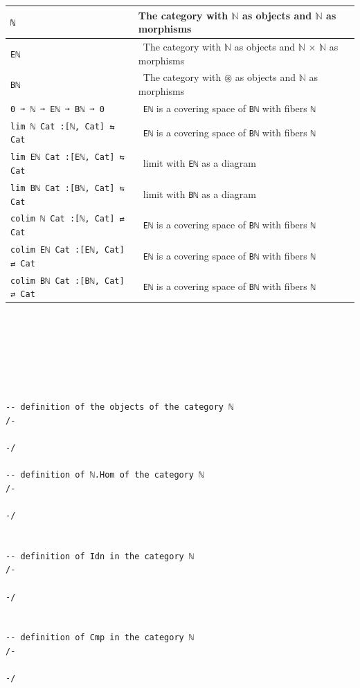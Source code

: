\documentclass{book}
\newcounter{lcounter}
\newcounter{sectioncount}
\newcounter{subsectioncount}
\renewcommand{\section}[1]{\newpage
\ \\
\ \\
 \begin{center} \scalebox{1.5}{\texttt{\thesectioncount . #1}} \setcounter{sectioncount}{\thesectioncount+1} \setcounter{subsectioncount}{1} \end{center}
 \begin{center}

\ \\
\ \\

\thispagestyle{empty}
\end{center}
}
\begin{document}
{
\small
\begin{center}
\begin{tabular}{|l | l |} 
  \hline
  \texttt{ℕ} & The category with $ℕ$ as objects and $\texttt{ℕ}$ as morphisms\\
  \hline
 \texttt{Eℕ} &\ The category with $\texttt{ℕ}$ as objects and $\texttt{ℕ × ℕ}$ as morphisms  \\
  \hline
 \texttt{Bℕ} &\ The category with $\texttt{⊛}$ as objects and $\texttt{ℕ}$ as morphisms \\
  \hline
 \texttt{0 ➞ ℕ ➞ Eℕ ➞ Bℕ ➞ 0} &\ \texttt{Eℕ} is a covering space of \texttt{Bℕ} with fibers \texttt{ℕ}\\
  \hline
 \texttt{lim ℕ Cat :[ℕ, Cat] ⇆ Cat} &\ \texttt{Eℕ} is a covering space of \texttt{Bℕ} with fibers \texttt{ℕ}\\
  \hline
 \texttt{lim Eℕ Cat :[Eℕ, Cat] ⇆ Cat} &\ limit with \texttt{Eℕ} as a diagram\\
  \hline
 \texttt{lim Bℕ Cat :[Bℕ, Cat] ⇆ Cat} &\ limit with \texttt{Bℕ} as a diagram\\
  \hline
 \texttt{colim ℕ Cat :[ℕ, Cat] ⇄ Cat} &\ \texttt{Eℕ} is a covering space of \texttt{Bℕ} with fibers \texttt{ℕ}\\
  \hline
 \texttt{colim Eℕ Cat :[Eℕ, Cat] ⇄ Cat} &\ \texttt{Eℕ} is a covering space of \texttt{Bℕ} with fibers \texttt{ℕ}\\
  \hline
 \texttt{colim Bℕ Cat :[Bℕ, Cat] ⇄ Cat} &\ \texttt{Eℕ} is a covering space of \texttt{Bℕ} with fibers \texttt{ℕ}\\
 \hline
\end{tabular}
\end{center}
}
\section{ℕ}

\begin{center}
\begin{tcolorbox}[width=5in,colback={white},title={\begin{center}\texttt{Lean \thelcounter} \addtocounter{lcounter}{1}  \end{center}},colbacktitle=Blue,coltitle=black]
\begin{verbatim}

-- definition of the objects of the category ℕ
/-

-/

-- definition of ℕ.Hom of the category ℕ
/-

-/


-- definition of Idn in the category ℕ
/-

-/


-- definition of Cmp in the category ℕ
/-

-/


\end{verbatim}%
\end{tcolorbox}
\end{center}
\end{document}
